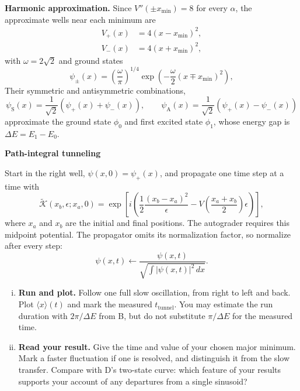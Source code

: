 \textbf{Harmonic approximation.} Since $V''(\pm x_\mathrm{min}) = 8$ for every $\alpha$, the approximate wells near each minimum are
\begin{align}
  V_+(x) & = 4(x-x_\mathrm{min})^2, \\
  V_-(x) & = 4(x+x_\mathrm{min})^2,
\end{align}
with $\omega = 2\sqrt{2}$ and ground states
\begin{equation}
  \psi_\pm(x) = \left(\frac{\omega}{\pi}\right)^{1/4} \exp\left(- \frac{\omega}{2}(x\mp x_\mathrm{min})^2\right),
\end{equation}
Their symmetric and antisymmetric combinations,
\begin{equation}
  \psi_\mathrm{S}(x) = \frac{1}{\sqrt{2}}\left( \psi_+(x) + \psi_-(x) \right), \qquad
  \psi_\mathrm{A}(x) = \frac{1}{\sqrt{2}}\left( \psi_+(x) - \psi_-(x) \right)
\end{equation}
approximate the ground state $\phi_0$ and first excited state $\phi_1$, whose energy gap is $\Delta E = E_1-E_0$.

\begin{problem}[10]
  \textbf{Path-integral tunneling}

  Start in the right well, $\psi(x,0)=\psi_+(x)$, and propagate one time step at a time with
  \begin{equation}
    \tilde{\mathcal K}(x_b, \epsilon; x_a, 0) = \exp \left[ i \left(\frac{1}{2}\frac{(x_b - x_a)^2}{\epsilon} - V\left(\frac{x_a+x_b}{2}\right) \epsilon\right) \right],
  \end{equation}
  where $x_a$ and $x_b$ are the initial and final positions.
  The autograder requires this midpoint potential.
  The propagator omits its normalization factor, so normalize after every step:
  \begin{equation}
    \psi(x, t) \leftarrow \frac{\psi(x, t)}{\sqrt{\int |\psi(x, t)|^2\, dx}}.
  \end{equation}

  \begin{enumerate}[(i)]
    \item \textbf{Run and plot.} Follow one full slow oscillation, from right to left and back.
          Plot $\langle x\rangle(t)$ and mark the measured $t_\mathrm{tunnel}$.
          You may estimate the run duration with $2\pi/\Delta E$ from B, but do not substitute $\pi/\Delta E$ for the measured time.
    \item \textbf{Read your result.} Give the time and value of your chosen major minimum.
          Mark a faster fluctuation if one is resolved, and distinguish it from the slow transfer.
          Compare with D's two-state curve: which feature of your results supports your account of any departures from a single sinusoid?
  \end{enumerate}
\end{problem}

